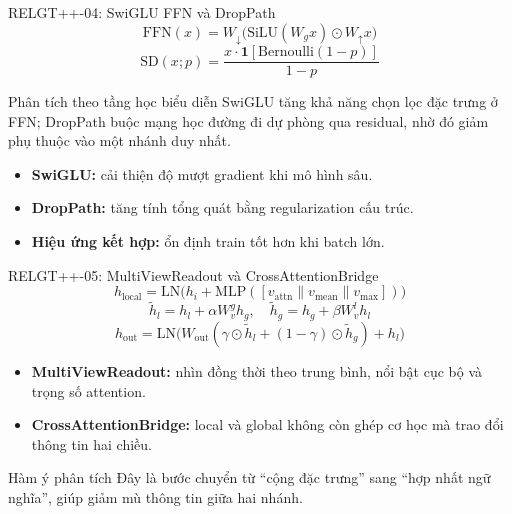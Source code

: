 \documentclass[aspectratio=169,11pt]{beamer}
\begin{document}
\begin{frame}{RELGT++-04: SwiGLU FFN và DropPath}
  \[
    \text{FFN}(x)=W_\downarrow\big(\text{SiLU}(W_gx)\odot W_\uparrow x\big)
  \]
  \[
    \text{SD}(x;p)=\frac{x\cdot\mathbf{1}[\text{Bernoulli}(1-p)]}{1-p}
  \]
  \begin{block}{Phân tích theo tầng học biểu diễn}
    SwiGLU tăng khả năng chọn lọc đặc trưng ở FFN; DropPath buộc mạng học đường đi dự phòng qua residual, nhờ đó giảm phụ thuộc vào một nhánh duy nhất.
  \end{block}
  \begin{itemize}
    \item \textbf{SwiGLU:} cải thiện độ mượt gradient khi mô hình sâu.
    \item \textbf{DropPath:} tăng tính tổng quát bằng regularization cấu trúc.
    \item \textbf{Hiệu ứng kết hợp:} ổn định train tốt hơn khi batch lớn.
  \end{itemize}
\end{frame}

\begin{frame}{RELGT++-05: MultiViewReadout và CrossAttentionBridge}
  \[
    h_\text{local}=\text{LN}\Big(h_i+\text{MLP}([v_\text{attn}\|v_\text{mean}\|v_\text{max}])\Big)
  \]
  \[
    \tilde h_l=h_l+\alpha W_v^g h_g,\quad
    \tilde h_g=h_g+\beta W_v^l h_l
  \]
  \[
    h_\text{out}=\text{LN}\big(W_\text{out}(\gamma\odot\tilde h_l+(1-\gamma)\odot\tilde h_g)+h_l\big)
  \]
  \begin{itemize}
    \item \textbf{MultiViewReadout:} nhìn đồng thời theo trung bình, nổi bật cục bộ và trọng số attention.
    \item \textbf{CrossAttentionBridge:} local và global không còn ghép cơ học mà trao đổi thông tin hai chiều.
  \end{itemize}
  \begin{exampleblock}{Hàm ý phân tích}
    Đây là bước chuyển từ “cộng đặc trưng” sang “hợp nhất ngữ nghĩa”, giúp giảm mù thông tin giữa hai nhánh.
  \end{exampleblock}
\end{frame}
\end{document}
